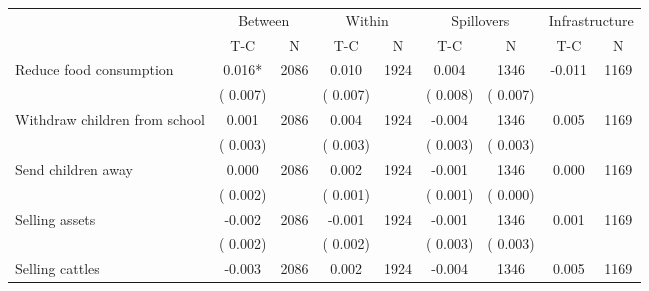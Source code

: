 
\begin{tabular}{l*{8}{c}}\hline&\multicolumn{2}{c}{Between}&\multicolumn{2}{c}{Within}&\multicolumn{2}{c}{Spillovers}&\multicolumn{2}{c}{Infrastructure}\\ \cmidrule(r){2-3}\cmidrule(l){4-5}\cmidrule(l){6-7}\cmidrule(l){8-9} & {T-C} & {N} & {T-C} & {N}  & {T-C}  & {N} & {T-C}  & {N} \\ \midrule
Reduce food consumption        &              0.016*      &       2086       &              0.010      &       1924       &              0.004      &       1346  &       -0.011 &       1169       \\
                       &       (       0.007)            &                               &       (       0.007)            &                               &       (       0.008)            &       (       0.007) &                  \\
Withdraw children from school        &              0.001      &       2086       &              0.004      &       1924       &             -0.004      &       1346  &        0.005 &       1169       \\
                       &       (       0.003)            &                               &       (       0.003)            &                               &       (       0.003)            &       (       0.003) &                  \\
Send children away        &              0.000      &       2086       &              0.002      &       1924       &             -0.001      &       1346  &        0.000 &       1169       \\
                       &       (       0.002)            &                               &       (       0.001)            &                               &       (       0.001)            &       (       0.000) &                  \\
Selling assets        &             -0.002      &       2086       &             -0.001      &       1924       &             -0.001      &       1346  &        0.001 &       1169       \\
                       &       (       0.002)            &                               &       (       0.002)            &                               &       (       0.003)            &       (       0.003) &                  \\
Selling cattles        &             -0.003      &       2086       &              0.002      &       1924       &             -0.004      &       1346  &        0.005 &       1169       \\

\end{tabular}
